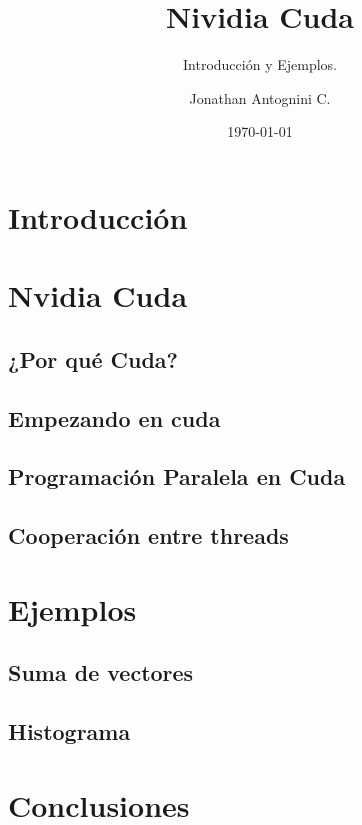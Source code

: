 \documentclass{beamer}
\title{Nividia Cuda}
\subtitle{Introducción y Ejemplos.}
\author{Jonathan Antognini C.}
\institute[]{Universidad Técnica Federico Santa María}
\date{\today}
\begin{document}
    \frame{\titlepage}
    \frame{\tableofcontents}
	\section{Introducción}
		
	\section{Nvidia Cuda}
		
		\subsection{¿Por qué Cuda?}
			
		\subsection{Empezando en cuda}
			
		\subsection{Programación Paralela en Cuda}
			
		\subsection{Cooperación entre threads}
			
	\section{Ejemplos}
		\subsection{Suma de vectores}
			
		\subsection{Histograma}
			
	\section{Conclusiones}
		
	
\end{document}
